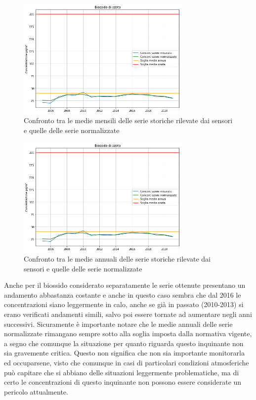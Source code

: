 \documentclass[a4paper]{report}
\begin{document}
\begin{figure}[h]
\centering
\includegraphics[width=0.75\textwidth]{no2_medie_annuali}
\caption{Confronto tra le medie mensili delle serie storiche rilevate dai sensori e quelle delle serie normalizzate}
\label{fig:no2_medie_annuali}
\end{figure}

\begin{figure}[h]
\centering
\includegraphics[width=0.75\textwidth]{no2_medie_annuali}
\caption{Confronto tra le medie annuali delle serie storiche rilevate dai sensori e quelle delle serie normalizzate}
\label{fig:no2_medie_annuali}
\end{figure}

Anche per il biossido considerato separatamente le serie ottenute presentano un andamento abbastanza costante e anche in questo caso sembra che dal 2016 le concentrazioni siano leggermente in calo, anche se già in passato (2010-2013) si erano verificati andamenti simili, salvo poi essere tornate ad aumentare negli anni successivi.
Sicuramente è importante notare che le medie annuali delle serie normalizzate rimangano sempre sotto alla soglia imposta dalla normativa vigente, a segno che comunque la situazione per quanto riguarda questo inquinante non sia gravemente critica. Questo non significa che non sia importante monitorarla ed occuparsene, visto che comunque in casi di particolari condizioni atmosferiche può capitare che si abbiano delle situazioni leggermente problematiche, ma di certo le concentrazioni di questo inquinante non possono essere considerate un pericolo attualmente.
\end{document}

